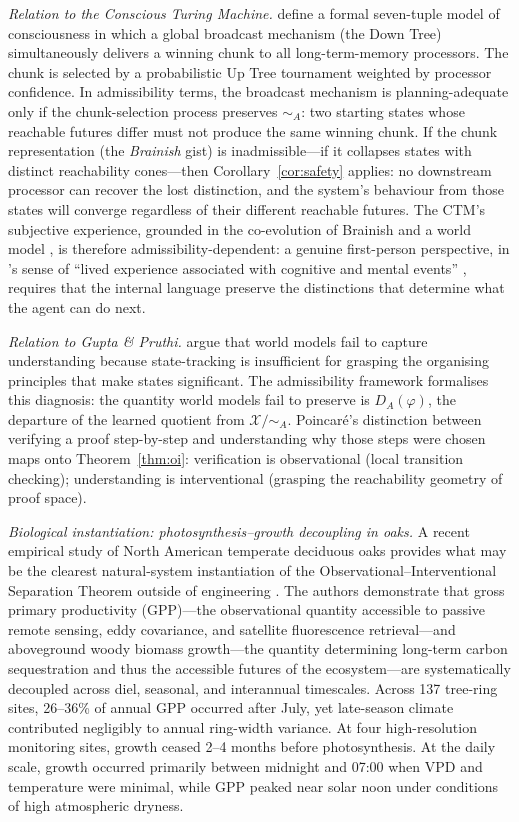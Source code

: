 \documentclass[10pt,twocolumn]{article}
\theoremstyle{plain}
\theoremstyle{definition}
\theoremstyle{remark}
\newcommand{\simA}{\sim_{\!A}}
\newcommand{\DA}{D_{A}(\varphi)}
\newcommand{\calX}{\mathcal{X}}
\newcommand{\Xmod}[1]{\calX/{\sim_{#1}}}
\begin{document}
\textit{Relation to the Conscious Turing Machine.} \citet{blum2022conscious}
define a formal seven-tuple model of consciousness in which a global broadcast
mechanism (the Down Tree) simultaneously delivers a winning chunk to all
long-term-memory processors. The chunk is selected by a probabilistic Up Tree
tournament weighted by processor confidence. In admissibility terms, the
broadcast mechanism is planning-adequate only if the chunk-selection process
preserves $\simA$: two starting states whose reachable futures differ must not
produce the same winning chunk. If the chunk representation (the \emph{Brainish}
gist) is inadmissible---if it collapses states with distinct reachability
cones---then Corollary~\ref{cor:safety} applies: no downstream processor can
recover the lost distinction, and the system's behaviour from those states will
converge regardless of their different reachable futures. The CTM's subjective
experience, grounded in the co-evolution of Brainish and a world model
\citep{blum2022conscious}, is therefore admissibility-dependent: a genuine
first-person perspective, in \citeauthor{varela1999first}'s sense of ``lived
experience associated with cognitive and mental events''
\citep{varela1999first}, requires that the internal language preserve the
distinctions that determine what the agent can do next.

\textit{Relation to Gupta \& Pruthi.} \citet{gupta2025world} argue that world
models fail to capture understanding because state-tracking is insufficient for
grasping the organising principles that make states significant. The admissibility
framework formalises this diagnosis: the quantity world models fail to preserve
is $\DA$, the departure of the learned quotient from $\Xmod{A}$. Poincar\'e's
distinction between verifying a proof step-by-step and understanding why those
steps were chosen \citep{poincare1914} maps onto Theorem~\ref{thm:oi}: verification
is observational (local transition checking); understanding is interventional
(grasping the reachability geometry of proof space).

\textit{Biological instantiation: photosynthesis--growth decoupling in oaks.}
A recent empirical study of North American temperate deciduous oaks provides
what may be the clearest natural-system instantiation of the
Observational--Interventional Separation Theorem outside of engineering
\citep{rao2026decoupled}. The authors demonstrate that gross primary
productivity (GPP)---the observational quantity accessible to passive remote
sensing, eddy covariance, and satellite fluorescence retrieval---and
aboveground woody biomass growth---the quantity determining long-term carbon
sequestration and thus the accessible futures of the ecosystem---are
systematically decoupled across diel, seasonal, and interannual timescales.
Across 137 tree-ring sites, 26--36\% of annual GPP occurred after July,
yet late-season climate contributed negligibly to annual ring-width variance.
At four high-resolution monitoring sites, growth ceased 2--4 months before
photosynthesis. At the daily scale, growth occurred primarily between midnight
and 07:00 when VPD and temperature were minimal, while GPP peaked near solar
noon under conditions of high atmospheric dryness.
\end{document}
